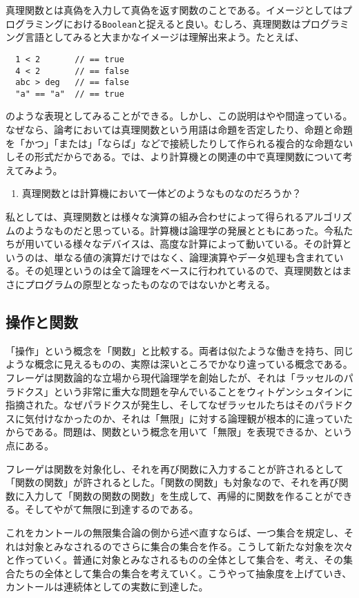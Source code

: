 \documentclass[a4paper,onecolumn,article]{jarticle}
\newcounter{ct}               %
\begin{document}
真理関数とは真偽を入力して真偽を返す関数のことである。イメージとしてはプログラミングにおける\texttt{Boolean}と捉えると良い。むしろ、真理関数はプログラミング言語としてみると大まかなイメージは理解出来よう。たとえば、
\begin{verbatim}
  1 < 2       // == true
  4 < 2       // == false
  abc > deg   // == false
  "a" == "a"  // == true
\end{verbatim}
のような表現としてみることができる。しかし、この説明はやや間違っている。なぜなら、論考においては真理関数という用語は命題を否定したり、命題と命題を「かつ」「または」「ならば」などで接続したりして作られる複合的な命題ないしその形式だからである。では、より計算機との関連の中で真理関数について考えてみよう。
\begin{enumerate}
  \item 真理関数とは計算機において一体どのようなものなのだろうか？
\end{enumerate}

私としては、真理関数とは様々な演算の組み合わせによって得られるアルゴリズムのようなものだと思っている。計算機は論理学の発展とともにあった。今私たちが用いている様々なデバイスは、高度な計算によって動いている。その計算というのは、単なる値の演算だけではなく、論理演算やデータ処理も含まれている。その処理というのは全て論理をベースに行われているので、真理関数とはまさにプログラムの原型となったものなのではないかと考える。


\subsection{操作と関数}

「操作」という概念を「関数」と比較する。両者は似たような働きを持ち、同じような概念に見えるものの、実際は深いところでかなり違っている概念である。フレーゲは関数論的な立場から現代論理学を創始したが、それは「ラッセルのパラドクス」という非常に重大な問題を孕んでいることをウィトゲンシュタインに指摘された。なぜパラドクスが発生し、そしてなぜラッセルたちはそのパラドクスに気付けなかったのか、それは「無限」に対する論理観が根本的に違っていたからである。問題は、関数という概念を用いて「無限」を表現できるか、という点にある。

フレーゲは関数を対象化し、それを再び関数に入力することが許されるとして「関数の関数」が許されるとした。「関数の関数」も対象なので、それを再び関数に入力して「関数の関数の関数」を生成して、再帰的に関数を作ることができる。そしてやがて無限に到達するのである。

これをカントールの無限集合論の側から述べ直すならば、一つ集合を規定し、それは対象とみなされるのでさらに集合の集合を作る。こうして新たな対象を次々と作っていく。普通に対象とみなされるものの全体として集合を、考え、その集合たちの全体として集合の集合を考えていく。こうやって抽象度を上げていき、カントールは連続体としての実数に到達した。
\end{document}
